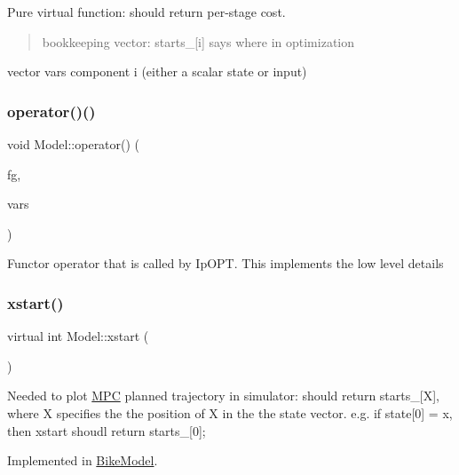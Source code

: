 Pure virtual function\+: should return per-\/stage cost. 

\begin{quote}
bookkeeping vector\+: starts\+\_\+\mbox{[}i\mbox{]} says where in optimization \end{quote}
vector vars component i (either a scalar state or input) \mbox{\label{classModel_a138487dfb01ab6af0856c493f20ad179}} 
\subsubsection{\texorpdfstring{operator()()}{operator()()}}
{\footnotesize\ttfamily void Model\+::operator() (\begin{DoxyParamCaption}\item[{A\+D\+Vec \&}]{fg,  }\item[{const A\+D\+Vec \&}]{vars }\end{DoxyParamCaption})\hspace{0.3cm}{\ttfamily [inline]}}

Functor operator that is called by Ip\+O\+PT. This implements the low level details \mbox{\label{classModel_ab98f8c18036d9bada533325300865c5e}} 
\subsubsection{\texorpdfstring{xstart()}{xstart()}}
{\footnotesize\ttfamily virtual int Model\+::xstart (\begin{DoxyParamCaption}{ }\end{DoxyParamCaption})\hspace{0.3cm}{\ttfamily [pure virtual]}}

Needed to plot \mbox{\hyperlink{classMPC}{M\+PC}} planned trajectory in simulator\+: should return starts\+\_\+\mbox{[}X\mbox{]}, where X specifies the the position of X in the the state vector. e.\+g. if state\mbox{[}0\mbox{]} = x, then xstart shoudl return starts\+\_\+\mbox{[}0\mbox{]}; 

Implemented in \mbox{\hyperlink{classBikeModel_a920787379d6fef804f46bc1f3f885a89}{Bike\+Model}}.

\mbox{\label{classModel_ae505a277c05e465d0a41fa75d4116350}} 
